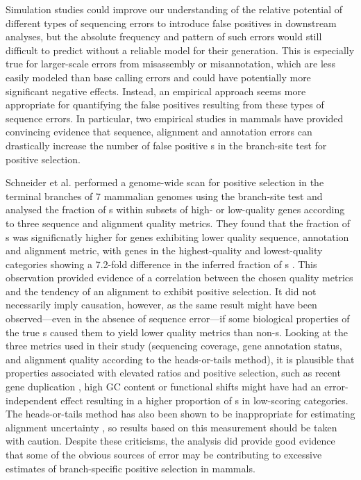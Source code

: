 Simulation studies could improve our understanding of the relative
potential of different types of sequencing errors to introduce false
positives in downstream analyses, but the absolute frequency and
pattern of such errors would still difficult to predict without a
reliable model for their generation. This is especially true for
larger-scale errors from misassembly or misannotation, which are less
easily modeled than base calling errors and could have potentially
more significant negative effects. Instead, an empirical approach
seems more appropriate for quantifying the false positives resulting
from these types of sequence errors. In particular, two empirical
studies in mammals have provided convincing evidence that sequence,
alignment and annotation errors can drastically increase the number of
false positive \psg{}s in the branch-site test for positive selection.

Schneider et al. \citeyearpar{Schneider2009} performed a genome-wide
scan for positive selection in the terminal branches of 7 mammalian
genomes using the branch-site test and analysed the fraction of
\psg{}s within subsets of high- or low-quality genes according to
three sequence and alignment quality metrics. They found that the
fraction of \psg{}s was significnatly higher for genes exhibiting
lower quality sequence, annotation and alignment metric, with genes in
the highest-quality and lowest-quality categories showing a 7.2-fold
difference in the inferred fraction of \psg{}s
\citep{Schneider2009}. This observation provided evidence of a
correlation between the chosen quality metrics and the tendency of an
alignment to exhibit positive selection. It did not necessarily imply
causation, however, as the same result might have been observed---even
in the absence of sequence error---if some biological properties of
the true \psg{}s caused them to yield lower quality metrics than
non-\psg{}s. Looking at the three metrics used in their study
(sequencing coverage, gene annotation status, and alignment quality
according to the heads-or-tails method), it is plausible that
properties associated with elevated \omg ratios and positive
selection, such as recent gene duplication
\citep{Beisswanger2008,Studer2008,Casola2009}, high GC content
\citep{Ratnakumar2010} or functional shifts \citep{Storz2008,Wang2001}
might have had an error-independent effect resulting in a higher
proportion of \psg{}s in low-scoring categories. The heads-or-tails
method has also been shown to be inappropriate for estimating
alignment uncertainty \citep{Fletcher2010}, so results based on this
measurement should be taken with caution. Despite these criticisms,
the analysis did provide good evidence that some of the obvious
sources of error may be contributing to excessive estimates of
branch-specific positive selection in mammals.

